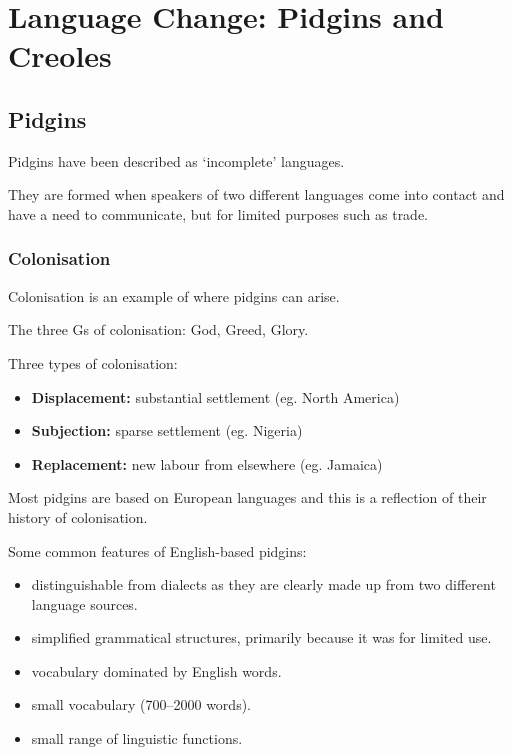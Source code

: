 \documentclass[../main.tex]{subfiles}
\begin{document}
    \section{Language Change: Pidgins and Creoles}

    \subsection{Pidgins}
    Pidgins have been described as `incomplete' languages. \par
    They are formed when speakers of two different languages come into contact and have a need to communicate, but for limited purposes such as trade. \par

    \subsubsection{Colonisation}
    Colonisation is an example of where pidgins can arise. \par
    
    The three Gs of colonisation: God, Greed, Glory.

    Three types of colonisation: 
    \begin{itemize}
        \item \textbf{Displacement:} substantial settlement (eg. North America)
        \item \textbf{Subjection:} sparse settlement (eg. Nigeria)
        \item \textbf{Replacement:} new labour from elsewhere (eg. Jamaica)
    \end{itemize}
    Most pidgins are based on European languages and this is a reflection of their history of colonisation.


    Some common features of English-based pidgins:
    \begin{itemize}
        \item distinguishable from dialects as they are clearly made up from two different language sources.
        \item simplified grammatical structures, primarily because it was for limited use.
        \item vocabulary dominated by English words.
        \item small vocabulary (700--2000 words).
        \item small range of linguistic functions.
    \end{itemize}
\end{document}
